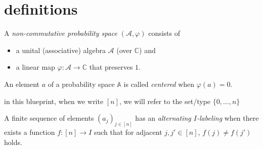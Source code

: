 %

\chapter{definitions}

\begin{definition}
  \label{def:NCPS}
  A \textit{non-commutative probability space} \((\mathcal{A},\varphi)\) consists of
  \begin{itemize}
    \item a unital (associative) algebra \(\mathcal{A}\) (over \(\mathbb{C}\)) and
    \item a linear map \(\varphi:\mathcal{A} \rightarrow \mathbb{C}\) that preserves \(1\).
  \end{itemize}
\end{definition}

\begin{definition}
  \label{def:centered}
  An element \(a\) of a probability space \(\mathbb{A}\) is called \textit{centered} when
  \(\varphi(a)=0\).
\end{definition}

in this blueprint, when we write \([n]\), we will refer to the set/type \(\{0,\ldots,n\}\)

\begin{definition}
  \label{def:alt_label}
  A finite sequence of elements \((a_j)_{j\in [n]}\) has an \textit{alternating \(I\)-labeling} when
  there exists a function \(f:[n]\rightarrow I\) such that for adjacent \(j,j' \in [n]\),
  \(f(j)\neq f(j')\) holds.
\end{definition}

